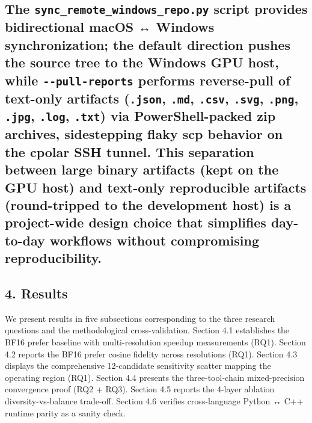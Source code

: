 \documentclass[
]{article}
\begin{document}
\subsection{\texorpdfstring{The \texttt{sync\_remote\_windows\_repo.py}
script provides bidirectional macOS ↔ Windows synchronization; the
default direction pushes the source tree to the Windows GPU host, while
\texttt{-\/-pull-reports} performs reverse-pull of text-only artifacts
(\texttt{.json}, \texttt{.md}, \texttt{.csv}, \texttt{.svg},
\texttt{.png}, \texttt{.jpg}, \texttt{.log}, \texttt{.txt}) via
PowerShell-packed zip archives, sidestepping flaky scp behavior on the
cpolar SSH tunnel. This separation between large binary artifacts (kept
on the GPU host) and text-only reproducible artifacts (round-tripped to
the development host) is a project-wide design choice that simplifies
day-to-day workflows without compromising
reproducibility.}{The sync\_remote\_windows\_repo.py script provides bidirectional macOS ↔ Windows synchronization; the default direction pushes the source tree to the Windows GPU host, while -\/-pull-reports performs reverse-pull of text-only artifacts (.json, .md, .csv, .svg, .png, .jpg, .log, .txt) via PowerShell-packed zip archives, sidestepping flaky scp behavior on the cpolar SSH tunnel. This separation between large binary artifacts (kept on the GPU host) and text-only reproducible artifacts (round-tripped to the development host) is a project-wide design choice that simplifies day-to-day workflows without compromising reproducibility.}}\label{the-sync_remote_windows_repopy-script-provides-bidirectional-macos--windows-synchronization-the-default-direction-pushes-the-source-tree-to-the-windows-gpu-host-while---pull-reports-performs-reverse-pull-of-text-only-artifacts-json-md-csv-svg-png-jpg-log-txt-via-powershell-packed-zip-archives-sidestepping-flaky-scp-behavior-on-the-cpolar-ssh-tunnel-this-separation-between-large-binary-artifacts-kept-on-the-gpu-host-and-text-only-reproducible-artifacts-round-tripped-to-the-development-host-is-a-project-wide-design-choice-that-simplifies-day-to-day-workflows-without-compromising-reproducibility}

\subsection{4. Results}\label{4-results}

We present results in five subsections corresponding to the three
research questions and the methodological cross-validation. Section 4.1
establishes the BF16 prefer baseline with multi-resolution speedup
measurements (RQ1). Section 4.2 reports the BF16 prefer cosine fidelity
across resolutions (RQ1). Section 4.3 displays the comprehensive
12-candidate sensitivity scatter mapping the operating region (RQ1).
Section 4.4 presents the three-tool-chain mixed-precision convergence
proof (RQ2 + RQ3). Section 4.5 reports the 4-layer ablation
diversity-vs-balance trade-off. Section 4.6 verifies cross-language
Python ↔ C++ runtime parity as a sanity check.
\end{document}
